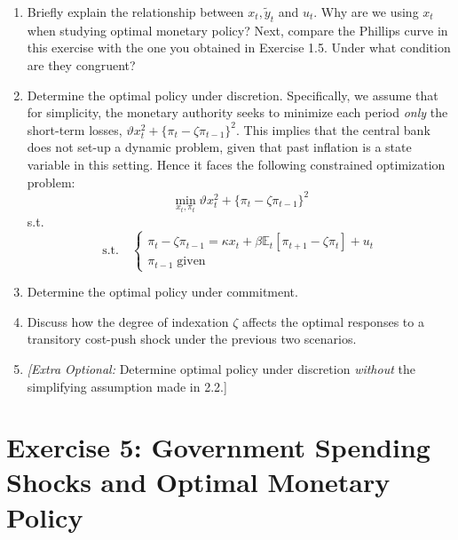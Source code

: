 \documentclass[a4paper,11pt]{article}
\begin{document}
\begin{enumerate}
    \item Briefly explain the relationship between $x_t, \widetilde{y}_t$ and $u_t$. Why are we using $x_t$ when studying optimal monetary policy? Next, compare the Phillips curve in this exercise with the one you obtained in Exercise 1.5. Under what condition are they congruent?
    
    \item Determine the optimal policy under discretion. Specifically, we assume that for simplicity, the monetary authority seeks to minimize each
period \textit{only} the short-term losses, $\vartheta x_t^2 + \{ \pi_t  - \zeta \pi_{t-1} \}^2$. This implies that the central bank does not set-up a dynamic problem, given that past inflation is a state variable in this setting. Hence it faces the following constrained optimization problem: 
\begin{equation*}
    \min_{x_t, \pi_t} \vartheta x_t^2 + \{ \pi_t  - \zeta \pi_{t-1} \}^2
\end{equation*}
s.t.
$$\mathrm{s.t.}\quad\begin{cases}
\pi_t - \zeta \pi_{t-1} = \kappa x_t + \beta \mathbb{E}_t [\pi_{t+1} - \zeta \pi_t] + u_t \\
\pi_{t-1} \;\text{given}
\end{cases} $$



\item Determine the optimal policy under commitment. 
\item Discuss how the degree of indexation $\zeta$ affects the optimal responses
to a transitory cost-push shock under the previous two scenarios.
\item \textit{[Extra Optional:} Determine optimal policy under discretion \textit{without} the simplifying assumption made in 2.2.]
\end{enumerate}




%




\section*{Exercise 5: Government Spending Shocks and Optimal Monetary Policy}
\end{document}
